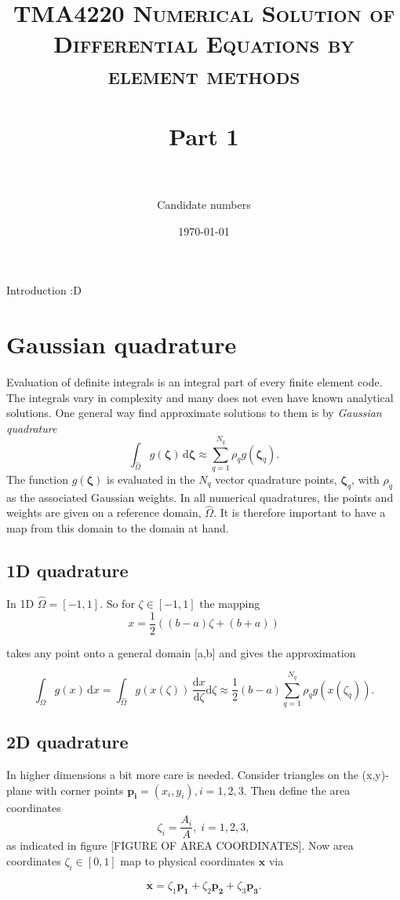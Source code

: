 \documentclass[paper=a4, fontsize=11pt]{scrartcl} %
\title{	
\normalfont \normalsize 
\textsc{TMA4220 Numerical Solution of Differential Equations by element methods} \\ [25pt] %
\horrule{0.5pt} \\[0.4cm] %
\huge Part 1 \\ %
\horrule{2pt} \\[0.5cm] %
}
\author{Candidate numbers} %
\date{\normalsize\today} %
\begin{document}
\maketitle

Introduction :D

\section{Gaussian quadrature}
Evaluation of definite integrals is an integral part of every finite element code. The integrals vary in complexity and many does not even have known analytical solutions. One general way find approximate solutions to them is by  \textit{Gaussian quadrature}
\[ \int_{\hat{\Omega}} \! g(\mathbf{\zeta}) \, \mathrm{d}\mathbf{\zeta} \approx \sum_{q=1}^{N_q} \rho_{q}g(\mathbf{\zeta}_q).
\]
The function $g(\mathbf{\zeta})$ is evaluated in the $N_q$ vector quadrature points, $\mathbf{\zeta}_q$, with $\rho_q$ as the associated Gaussian weights. In all numerical quadratures, the points and weights are given on a reference domain, $\hat{\Omega}$. It is therefore important to have a map from this domain to the domain at hand.

\subsection{1D quadrature}

In 1D $\hat{\Omega}=[-1,1]$. So for $\zeta \in [-1,1]$ the mapping
\[ x=\frac{1}{2} \left((b-a) \zeta +(b+a)\right)
\]

takes any point onto a general domain [a,b] and gives the approximation

\[ \int_{\Omega} \! g(x) \, \mathrm{d}x = \int_{\hat{\Omega}} \! g\left(x(\zeta)\right) \, \frac{\mathrm{d}x}{\mathrm{d}\zeta}\mathrm{d}\zeta \approx \frac{1}{2}(b-a) \sum_{q=1}^{N_q} \rho_{q}g(x(\zeta_q)).
\]

\subsection{2D quadrature}
In higher dimensions a bit more care is needed. Consider triangles on the (x,y)-plane with corner points $\mathbf{p_i}=(x_i,y_i), i=1,2,3$. Then define the area coordinates 
\[ \zeta_i = \frac{A_i}{A}, \; i=1,2,3,\]
as indicated in figure [FIGURE OF AREA COORDINATES]. Now area coordinates $\zeta_i \in [0,1]$ map to physical coordinates $\mathbf{x}$ via

\[ \mathbf{x} = \zeta_1\mathbf{p_1} +\zeta_2\mathbf{p_2} +\zeta_3\mathbf{p_3}.
\]
\end{document}
